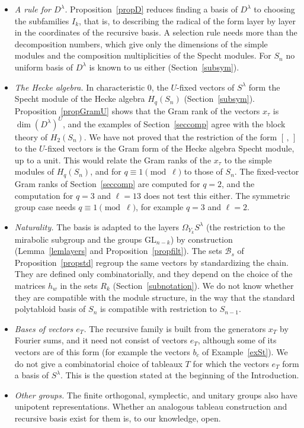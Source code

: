 \documentclass[11pt, letterpaper]{amsart}
\theoremstyle{definition}
\theoremstyle{remark}
\newcommand{\GL}{\mathrm{GL}}
\begin{document}
\begin{itemize}
\item \emph{A rule for $D^\lambda$.} Proposition~\ref{propD} reduces finding a basis of $D^\lambda$ to choosing the subfamilies $I_k$, that is, to describing the radical of the form layer by layer in the coordinates of the recursive basis. A selection rule needs more than the decomposition numbers, which give only the dimensions of the simple modules and the composition multiplicities of the Specht modules. For $S_n$ no uniform basis of $D^\lambda$ is known to us either (Section~\ref{subsym}).
\item \emph{The Hecke algebra.} In characteristic $0$, the $U$-fixed vectors of $S^\lambda$ form the Specht module of the Hecke algebra $H_q(S_n)$ (Section~\ref{subsym}). Proposition~\ref{propGramU} shows that the Gram rank of the vectors $x_\tau$ is $\dim(D^\lambda)^U$, and the examples of Section~\ref{seccomp} agree with the block theory of $H_2(S_n)$. We have not proved that the restriction of the form $[\,,\,]$ to the $U$-fixed vectors is the Gram form of the Hecke algebra Specht module, up to a unit. This would relate the Gram ranks of the $x_\tau$ to the simple modules of $H_q(S_n)$, and for $q\equiv1\pmod\ell$ to those of $S_n$. The fixed-vector Gram ranks of Section~\ref{seccomp} are computed for $q=2$, and the computation for $q=3$ and $\ell=13$ does not test this either. The symmetric group case needs $q\equiv1\pmod\ell$, for example $q=3$ and $\ell=2$.
\item \emph{Naturality.} The basis is adapted to the layers $\Omega_{Y_k}S^\lambda$ (the restriction to the mirabolic subgroup and the groups $\GL_{n-k}$) by construction (Lemma~\ref{lemlayers} and Proposition~\ref{propfilt}). The sets $\mathcal B_s$ of Proposition~\ref{propstd} regroup the same vectors by standardizing the chain. They are defined only combinatorially, and they depend on the choice of the matrices $h_w$ in the sets $R_k$ (Section~\ref{subnotation}). We do not know whether they are compatible with the module structure, in the way that the standard polytabloid basis of $S_n$ is compatible with restriction to $S_{n-1}$.
\item \emph{Bases of vectors $e_T$.} The recursive family is built from the generators $x_T$ by Fourier sums, and it need not consist of vectors $e_T$, although some of its vectors are of this form (for example the vectors $b_c$ of Example~\ref{exSt}). We do not give a combinatorial choice of tableaux $T$ for which the vectors $e_T$ form a basis of $S^\lambda$. This is the question stated at the beginning of the Introduction.
\item \emph{Other groups.} The finite orthogonal, symplectic, and unitary groups also have unipotent representations. Whether an analogous tableau construction and recursive basis exist for them is, to our knowledge, open.
\end{itemize}
\end{document}
